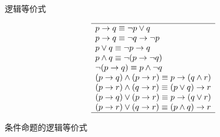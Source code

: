 {{\begin{minipage}[c]{\textwidth{}}
\begin{minipage}[c]{.6\textwidth{}}
\begin{table}[H]
                    \caption{逻辑等价式}
                \end{table}
            \end{minipage}%
            \begin{minipage}[c]{.4\textwidth{}}
                \begin{minipage}[c]{\textwidth{}}
                    \begin{table}[H]
                        \centering

                        \[
                            \begin{array}{l}
                                \hline
                                p \rightarrow q \equiv \neg p \vee q \\
                                p \rightarrow q \equiv \neg q \rightarrow \neg p \\
                                p \vee q \equiv \neg p \rightarrow q \\
                                p \wedge q \equiv \neg (p \rightarrow \neg q) \\
                                \neg (p \rightarrow q) \equiv p \wedge \neg q \\
                                (p \rightarrow q) \wedge (p \rightarrow r) \equiv p \rightarrow (q \wedge r) \\
                                (p \rightarrow r) \wedge (q \rightarrow r) \equiv (p \vee q) \rightarrow r \\
                                (p \rightarrow q) \vee (p \rightarrow r) \equiv p \rightarrow (q \vee r) \\
                                (p \rightarrow r) \vee (q \rightarrow r) \equiv (p \wedge q) \rightarrow r \\
                                \hline
                            \end{array}
                        \]

                        \caption{条件命题的逻辑等价式}
                    \end{table}
                \end{minipage}%

                \vfill

                \begin{minipage}[c]{\textwidth{}}
                    \begin{table}[H]
                        \centering


\end{table}
\end{minipage}
\end{minipage}
\end{minipage}}}
